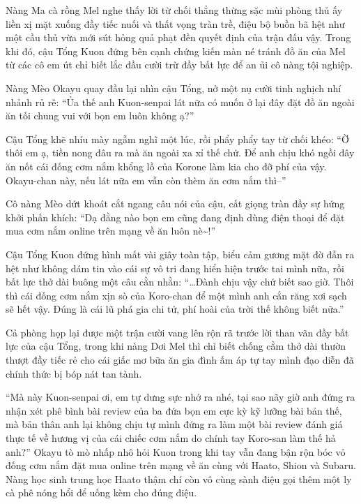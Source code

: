 \documentclass[../main.tex]{subfiles}
\begin{document}
Nàng Ma cà rồng Mel nghe thấy lời từ chối thẳng thừng sặc mùi phòng thủ ấy liền xị mặt xuống đầy tiếc nuối và thất vọng tràn trề, điệu bộ buồn bã hệt như một cầu thủ vừa mới sút hỏng quả phạt đền quyết định của trận đấu vậy. Trong khi đó, cậu Tổng Kuon đứng bên cạnh chứng kiến màn né tránh đồ ăn của Mel từ các cô em út chỉ biết lắc đầu cười trừ đầy bất lực để an ủi cô nàng tội nghiệp.

Nàng Mèo Okayu quay đầu lại nhìn cậu Tổng, nở một nụ cười tinh nghịch nhí nhảnh rủ rê: ``Ủa thế anh Kuon-senpai lát nữa có muốn ở lại đây đặt đồ ăn ngoài ăn tối chung vui với bọn em luôn không ạ?''

Cậu Tổng khẽ nhíu mày ngẫm nghĩ một lúc, rồi phẩy phẩy tay từ chối khéo: ``Ờ thôi em ạ, tiền nong đâu ra mà ăn ngoài xa xỉ thế chứ. Để anh chịu khó ngồi đây ăn nốt cái đống cơm nắm khổng lồ của Korone làm kia cho đỡ phí của vậy. Okayu-chan này, nếu lát nữa em vẫn còn thèm ăn cơm nắm thì--''

Cô nàng Mèo dứt khoát cắt ngang câu nói của cậu, cất giọng tràn đầy sự hứng khởi phấn khích: ``Dạ đằng nào bọn em cũng đang định dùng điện thoại để đặt mua cơm nắm online trên mạng về ăn luôn nè\~{}!''

Cậu Tổng Kuon đứng hình mất vài giây toàn tập, biểu cảm gương mặt đờ đẫn ra hệt như không dám tin vào cái sự vô tri đang hiển hiện trước tai mình nữa, rồi bất lực thở dài buông một câu cằn nhằn: ``\dots Đành chịu vậy chứ biết sao giờ. Thôi thì cái đống cơm nắm xịn sò của Koro-chan để một mình anh cắn răng xơi sạch sẽ hết vậy. Đúng là cái lũ phá gia chi tử, phí hoài của trời thế không biết nữa.''

Cả phòng họp lại được một trận cười vang lên rộn rã trước lời than vãn đầy bất lực của cậu Tổng, trong khi nàng Dơi Mel thì chỉ biết chống cằm thở dài thườn thượt đầy tiếc rẻ cho cái giấc mơ bữa ăn gia đình ấm áp tự tay mình đạo diễn đã chính thức bị bóp nát tan tành.

\omk

``Mà này Kuon-senpai ơi, em tự dưng sực nhớ ra nhé, tại sao nãy giờ anh đứng ra nhận xét phê bình bài review của ba đứa bọn em cực kỳ kỹ lưỡng bài bản thế, mà bản thân anh lại không chịu tự mình đứng ra làm một bài review đánh giá thực tế về hương vị của cái chiếc cơm nắm do chính tay Koro-san làm thế hả anh?'' Okayu tò mò nhấp nhô hỏi Kuon trong khi tay vẫn đang bận rộn bóc vỏ đống cơm nắm đặt mua online trên mạng về ăn cùng với Haato, Shion và Subaru. Nàng học sinh trung học Haato thậm chí còn vô cùng sành điệu gọi thêm một ly cà phê nóng hổi để uống kèm cho đúng điệu.
\end{document}
